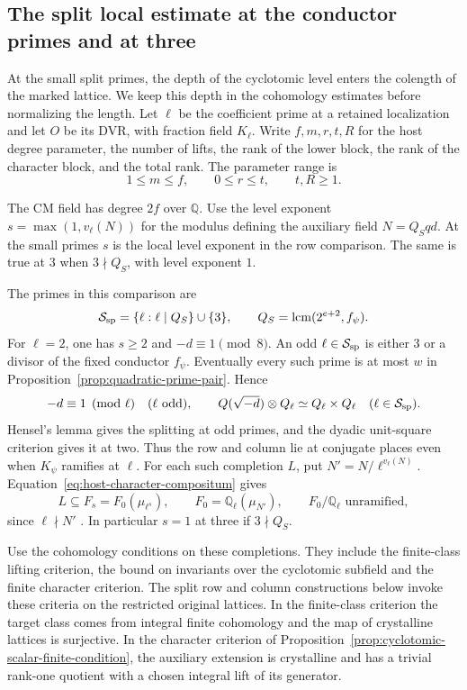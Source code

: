 \subsection{The split local estimate at the conductor primes and at three}
\label{subsec:split-local-length}
\hypertarget{source-small-prime-lengths}{}

At the small split primes, the depth of the cyclotomic level enters the colength of the marked lattice. We keep this depth in the cohomology estimates before normalizing the length. Let \(\ell\) be
the coefficient prime at a retained localization and let
\(O\) be its DVR, with fraction field \(K_\ell\).
Write \(f,m,r,t,R\) for the host degree parameter, the number
of lifts, the rank of the lower block, the rank of the
character block, and the total rank. The parameter range is
\[
 1\le m\le f,\qquad 0\le r\le t,\qquad t,R\ge1.
\]

The CM field has degree \(2f\) over \(\mathbb Q\).
Use the level exponent \(s=\max(1,v_\ell(N))\) for the modulus defining the auxiliary field \(N=Q_Sqd\). At the small primes \(s\) is the
local level exponent in the row comparison. The same is true
at \(3\) when \(3\nmid Q_S\), with level exponent \(1\).

The primes in this comparison are
\[
 \mathcal S_{\rm sp}=\{\ell:\ell\mid Q_S\}\cup\{3\},\qquad
 Q_S=\operatorname{lcm}(2^{e+2},f_\psi).
\]
For \(\ell=2\), one has \(s\ge2\) and \(-d\equiv1\pmod8\).
An odd \(\ell\in\mathcal S_{\rm sp}\) is either 3 or a divisor of
the fixed conductor \(f_\psi\). Eventually every such prime is at
most \(w\) in Proposition~\ref{prop:quadratic-prime-pair}. Hence
\[
     -d\equiv1\pmod\ell\quad(\ell\text{ odd}),\qquad
     \mathbb Q(\sqrt{-d})\otimes\mathbb Q_\ell
          \simeq\mathbb Q_\ell\times\mathbb Q_\ell
                  \quad(\ell\in\mathcal S_{\rm sp}).
\]
Hensel's lemma gives the splitting at odd primes, and the dyadic
unit-square criterion gives it at two. Thus the row and column lie at conjugate places
even when \(K_\psi\) ramifies at \(\ell\). For each such completion
\(L\), put \(N'=N/\ell^{v_\ell(N)}\). Equation~\eqref{eq:host-character-compositum} gives
\[
    L\subseteq F_s=F_0(\mu_{\ell^s}),\qquad
    F_0=\mathbb Q_\ell(\mu_{N'}),\qquad
    F_0/\mathbb Q_\ell\text{ unramified},
\]
since \(\ell\nmid N'\) \cite[Corollary~10.16]{sutherland-local-fields}.
In particular \(s=1\) at three if \(3\nmid Q_S\).

Use the cohomology conditions on these completions. They include the finite-class lifting criterion, the bound on invariants over the cyclotomic subfield and the finite character criterion. The
split row and column constructions below invoke these
criteria on the restricted original lattices. In the
finite-class criterion the target class comes from
integral finite cohomology and the map of crystalline
lattices is surjective. In the character criterion of
Proposition~\ref{prop:cyclotomic-scalar-finite-condition},
the auxiliary extension is crystalline and has a
trivial rank-one quotient with a chosen integral lift
of its generator. \label{cor:small-prime-lengths-1}

